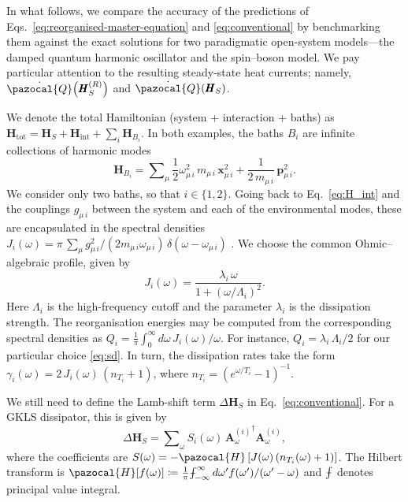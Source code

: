 \documentclass[aps,pra,superscriptaddress,twocolumn,nofootinbib]{revtex4-2}
\def\Xint#1{\mathchoice
{\XXint\displaystyle\textstyle{#1}}%
{\XXint\textstyle\scriptstyle{#1}}%
{\XXint\scriptstyle\scriptscriptstyle{#1}}%
{\XXint\scriptscriptstyle\scriptscriptstyle{#1}}%
\!\int}
\def\XXint#1#2#3{{\setbox0=\hbox{$#1{#2#3}{\int}$}
\vcenter{\hbox{$#2#3$}}\kern-.5\wd0}}
\def\dashint{\Xint-}
\begin{document}
In what follows, we compare the accuracy of the predictions of Eqs.~\eqref{eq:reorganised-master-equation} and \eqref{eq:conventional} by benchmarking them against the exact solutions for two paradigmatic open-system models---the damped quantum harmonic oscillator and the spin--boson model. We pay particular attention to the resulting steady-state heat currents; namely, $ \dot{\pazocal{Q}}\big(\pmb{H}_S^{(R)}\big) $ and $ \dot{\pazocal{Q}}(\pmb{H}_S) $.

We denote the total Hamiltonian (system + interaction + baths) as $\pmb{H}_\text{tot} = \pmb{H}_S + \pmb{H}_\text{int} + \sum\nolimits_i\pmb{H}_{B_i}$. In both examples, the baths $ B_i $ are infinite collections of harmonic modes
\begin{equation}\label{eq:h_bath}
    \pmb H_{B_i} = \sum\nolimits_\mu \frac12\omega_{\mu\,i}^2\,m_{\mu\,i}\,\pmb x_{\mu\,i}^2  + \frac{1}{2\,m_{\mu\,i}}\,\pmb p_{\mu\,i}^2.
\end{equation}
We consider only two baths, so that $i \in \{1,2\}$. Going back to Eq.~\eqref{eq:H_int} and the couplings $ g_{\mu\,i} $ between the system and each of the environmental modes, these are encapsulated in the spectral densities $J_i(\omega) = \pi\,\sum\nolimits_\mu g_{\mu\,i}^2/(2 m_{\mu\,i} \omega_{\mu\,i})\,\delta(\omega - \omega_{\mu\,i})$ \cite{weiss1999, bp}. We choose the common Ohmic--algebraic profile, given by 
\begin{equation}\label{eq:sd}
	J_i(\omega) = \frac{\lambda_i\,\omega}{1 + (\omega/\Lambda_i)^2}.    
\end{equation}
Here $ \Lambda_i $ is the high-frequency cutoff and the parameter $ \lambda_i $ is the dissipation strength. The reorganisation energies may be computed from the corresponding spectral densities as $ Q_i = \frac{1}{\pi}\int_{0}^\infty d\omega\,J_i(\omega)/\omega$.
For instance, $ Q_i = \lambda_i\,\Lambda_i/2$ for our particular choice \eqref{eq:sd}. In turn, the dissipation rates take the form $\gamma_i(\omega) = 2\,J_i(\omega)\,(n_{T_i}+1)$, where $n_{T_i} = (e^{\omega/T_i}-1)^{-1}$.

We still need to define the Lamb-shift term $ \Delta\pmb{H}_S $ in Eq.~\eqref{eq:conventional}. For a GKLS dissipator, this is given by
\begin{equation*}
    \Delta\pmb{H}_S = \sum\nolimits_\omega S_i(\omega)\,{\pmb{A}^{(i)}_\omega}^\dagger\pmb{A}_\omega^{(i)},
\end{equation*}
where the coefficients are $S(\omega) = -\pazocal{H}\,[J(\omega)\,( n_{T_i}(\omega)+1 )]$. The Hilbert transform is $ \pazocal{H}[f(\omega)] \coloneqq \frac{1}{\pi}\dashint_{-\infty}^\infty d\omega' f(\omega')/(\omega'-\omega) $ and $\dashint$ denotes principal value integral.
\end{document}

